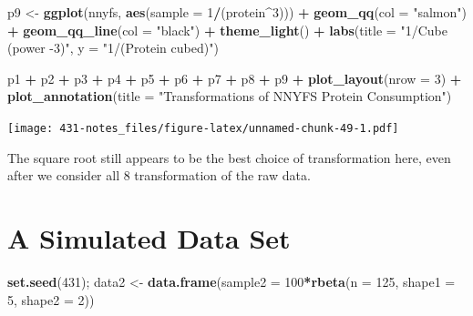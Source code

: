 \documentclass[
]{book}
\newenvironment{Shaded}{\begin{snugshade}}{\end{snugshade}}
\newcommand{\DataTypeTok}[1]{\textcolor[rgb]{0.13,0.29,0.53}{#1}}
\newcommand{\DecValTok}[1]{\textcolor[rgb]{0.00,0.00,0.81}{#1}}
\newcommand{\KeywordTok}[1]{\textcolor[rgb]{0.13,0.29,0.53}{\textbf{#1}}}
\newcommand{\NormalTok}[1]{#1}
\newcommand{\OperatorTok}[1]{\textcolor[rgb]{0.81,0.36,0.00}{\textbf{#1}}}
\newcommand{\StringTok}[1]{\textcolor[rgb]{0.31,0.60,0.02}{#1}}
\begin{document}
\begin{Shaded}
\begin{Highlighting}[]
\NormalTok{p9 <-}\StringTok{ }\KeywordTok{ggplot}\NormalTok{(nnyfs, }\KeywordTok{aes}\NormalTok{(}\DataTypeTok{sample =} \DecValTok{1}\OperatorTok{/}\NormalTok{(protein}\OperatorTok{^}\DecValTok{3}\NormalTok{))) }\OperatorTok{+}
\StringTok{    }\KeywordTok{geom_qq}\NormalTok{(}\DataTypeTok{col =} \StringTok{"salmon"}\NormalTok{) }\OperatorTok{+}\StringTok{ }
\StringTok{    }\KeywordTok{geom_qq_line}\NormalTok{(}\DataTypeTok{col =} \StringTok{"black"}\NormalTok{) }\OperatorTok{+}
\StringTok{    }\KeywordTok{theme_light}\NormalTok{() }\OperatorTok{+}
\StringTok{    }\KeywordTok{labs}\NormalTok{(}\DataTypeTok{title =} \StringTok{"1/Cube (power -3)"}\NormalTok{,}
         \DataTypeTok{y =} \StringTok{"1/(Protein cubed)"}\NormalTok{)}


\NormalTok{p1 }\OperatorTok{+}\StringTok{ }\NormalTok{p2 }\OperatorTok{+}\StringTok{ }\NormalTok{p3 }\OperatorTok{+}\StringTok{ }\NormalTok{p4 }\OperatorTok{+}\StringTok{ }\NormalTok{p5 }\OperatorTok{+}\StringTok{ }\NormalTok{p6 }\OperatorTok{+}\StringTok{ }\NormalTok{p7 }\OperatorTok{+}\StringTok{ }\NormalTok{p8 }\OperatorTok{+}\StringTok{ }\NormalTok{p9 }\OperatorTok{+}
\StringTok{    }\KeywordTok{plot_layout}\NormalTok{(}\DataTypeTok{nrow =} \DecValTok{3}\NormalTok{) }\OperatorTok{+}
\StringTok{    }\KeywordTok{plot_annotation}\NormalTok{(}\DataTypeTok{title =} \StringTok{"Transformations of NNYFS Protein Consumption"}\NormalTok{)}
\end{Highlighting}
\end{Shaded}

\texttt{[image: 431-notes\_files/figure-latex/unnamed-chunk-49-1.pdf]}

The square root still appears to be the best choice of transformation here, even after we consider all 8 transformation of the raw data.

\hypertarget{a-simulated-data-set}{%
\section{A Simulated Data Set}\label{a-simulated-data-set}}

\begin{Shaded}
\begin{Highlighting}[]
\KeywordTok{set.seed}\NormalTok{(}\DecValTok{431}\NormalTok{); }
\NormalTok{data2 <-}\StringTok{ }\KeywordTok{data.frame}\NormalTok{(}\DataTypeTok{sample2 =} \DecValTok{100}\OperatorTok{*}\KeywordTok{rbeta}\NormalTok{(}\DataTypeTok{n =} \DecValTok{125}\NormalTok{, }\DataTypeTok{shape1 =} \DecValTok{5}\NormalTok{, }\DataTypeTok{shape2 =} \DecValTok{2}\NormalTok{))}
\end{Highlighting}
\end{Shaded}
\end{document}
